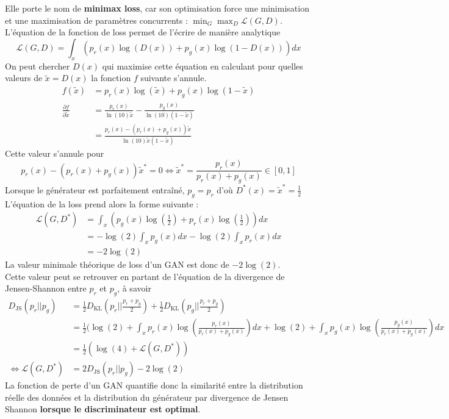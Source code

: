 \documentclass{article}
\begin{document}
Elle porte le nom de \textbf{minimax loss}, car son optimisation force une minimisation et une maximisation de paramètres concurrents : $ \min_{G} \max_{D} \mathcal{L}(G,D) $.
L'équation de la fonction de loss permet de l'écrire de manière analytique
$$ \mathcal{L}(G,D) = \int_x (p_r(x) \log(D(x)) + p_g(x) \log(1-D(x)))dx$$
On peut chercher $D(x)$ qui maximise cette équation en calculant pour quelles valeurs de $\tilde{x} = D(x)$ la fonction $f$ suivante s'annule.
\begin{align*}
    f(\tilde{x}) &= p_r(x)\log(\tilde{x}) + p_g(x)\log(1 - \tilde{x}) \\
    \frac{\partial f}{\partial \tilde{x}} &= \frac{p_r(x)}{\ln(10) \tilde{x}} - \frac{p_g(x)}{\ln(10)(1-\tilde{x})} \\
    &= \frac{p_r(x) - (p_r(x)+p_g(x))\tilde{x}}{\ln(10)\tilde{x}(1-\tilde{x})}
\end{align*}
Cette valeur s'annule pour
$$p_r(x) - (p_r(x)+p_g(x))\tilde{x}^* = 0 \Leftrightarrow  \boxed{\tilde{x}^* = \frac{p_r(x)}{p_r(x)+p_g(x)}} \in [0,1]$$
Lorsque le générateur est parfaitement entraîné, $p_g = p_r$ d'où $D^*(x) = \tilde{x}^* = \frac{1}{2}$
L'équation de la loss prend alors la forme suivante :
\begin{align*}
\mathcal{L}(G,D^*) &= \int_x (p_g(x) \log(\frac{1}{2}) + p_r(x) \log(\frac{1}{2}))dx \\
&= -\log(2) \int_x p_g(x)dx -\log(2) \int_x p_r(x)dx \\
&= -2\log(2)
\end{align*}
La valeur minimale théorique de loss d'un GAN est donc de $-2\log(2)$. \\
Cette valeur peut se retrouver en partant de l'équation de la divergence de Jensen-Shannon entre $p_r$ et $p_g$, à savoir
\begin{align*}
D_{\text{JS}}(p_r||p_g) &= \frac{1}{2} D_{\text{KL}}(p_r||\frac{p_r+p_g}{2}) + \frac{1}{2} D_{\text{KL}}(p_g||\frac{p_r+p_g}{2}) \\
&= \frac{1}{2} (\log(2) + \int_x p_r(x) \log(\frac{p_r(x)}{p_r(x)+p_g(x)})dx + \log(2) + \int_x p_g(x) \log(\frac{p_g(x)}{p_r(x)+p_g(x)})dx \\
&= \frac{1}{2}(\log(4) + \mathcal{L}(G, D^*)) \\
\Leftrightarrow \mathcal{L}(G, D^*) &=  2 D_{\text{JS}}(p_r||p_g) - 2\log(2)
\end{align*}
La fonction de perte d'un GAN quantifie donc la similarité entre la distribution réelle des données et la distribution du générateur par divergence de Jensen Shannon \textbf{lorsque le discriminateur est optimal}.
\end{document}
